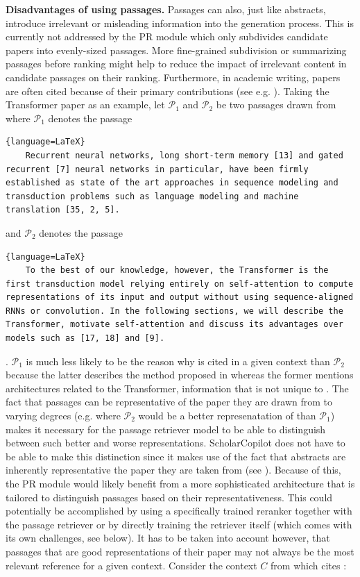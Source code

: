 \textbf{Disadvantages of using passages.} Passages can also, just like abstracts, introduce irrelevant or misleading information into the generation process. This is currently not addressed by the PR module which only subdivides candidate papers into evenly-sized passages. More fine-grained subdivision or summarizing passages before ranking might help to reduce the impact of irrelevant content in candidate passages on their ranking. Furthermore, in academic writing, papers are often cited because of their primary contributions (see e.g. ). Taking the Transformer paper \cite{vaswani2017attention} as an example, let $\mathcal{P}_1$ and $\mathcal{P}_2$ be two passages drawn from \cite{vaswani2017attention} where $\mathcal{P}_1$ denotes the passage
\newpage
\begin{lstlisting}{language=LaTeX}
    Recurrent neural networks, long short-term memory [13] and gated recurrent [7] neural networks in particular, have been firmly established as state of the art approaches in sequence modeling and transduction problems such as language modeling and machine translation [35, 2, 5].
\end{lstlisting}
\cite[1]{vaswani2017attention} and $\mathcal{P}_2$ denotes the passage
\begin{lstlisting}{language=LaTeX}
    To the best of our knowledge, however, the Transformer is the first transduction model relying entirely on self-attention to compute representations of its input and output without using sequence-aligned RNNs or convolution. In the following sections, we will describe the Transformer, motivate self-attention and discuss its advantages over models such as [17, 18] and [9].
\end{lstlisting}
\cite[2]{vaswani2017attention}. $\mathcal{P}_1$ is much less likely to be the reason why \cite{vaswani2017attention} is cited in a given context than $\mathcal{P}_2$ because the latter describes the method proposed in \cite{vaswani2017attention} whereas the former mentions architectures related to the Transformer, information that is not unique to \cite{vaswani2017attention}. The fact that passages can be representative of the paper they are drawn from to varying degrees (e.g. where $\mathcal{P}_2$ would be a better represenatation of \cite{vaswani2017attention} than $\mathcal{P}_1$) makes it necessary for the passage retriever model to be able to distinguish between such better and worse representations. ScholarCopilot does not have to be able to make this distinction since it makes use of the fact that abstracts are inherently representative the paper they are taken from (see \cite{cross2006abstracts}). Because of this, the PR module would likely benefit from a more sophisticated architecture that is tailored to distinguish passages based on their representativeness. This could potentially be accomplished by using a specifically trained reranker together with the passage retriever or by directly training the retriever itself (which comes with its own challenges, see below). It has to be taken into account however, that passages that are good representations of their paper may not always be the most relevant reference for a given context. Consider the context $C$ from \cite{chen2023cf} which cites \cite{dosovitskiy2020image}:

